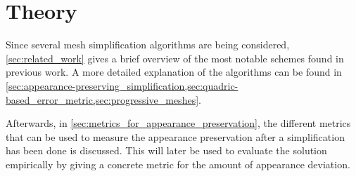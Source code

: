 

\chapter{Theory} \label{ch:theory}

Since several mesh simplification algorithms are being considered, \cref{sec:related_work} gives a brief overview of the most notable schemes found in previous work. A more detailed explanation of the algorithms can be found in \cref{sec:appearance-preserving_simplification,sec:quadric-based_error_metric,sec:progressive_meshes}.

Afterwards, in \cref{sec:metrics_for_appearance_preservation}, the different metrics that can be used to measure the appearance preservation after a simplification has been done is discussed. This will later be used to evaluate the solution empirically by giving a concrete metric for the amount of appearance deviation.

